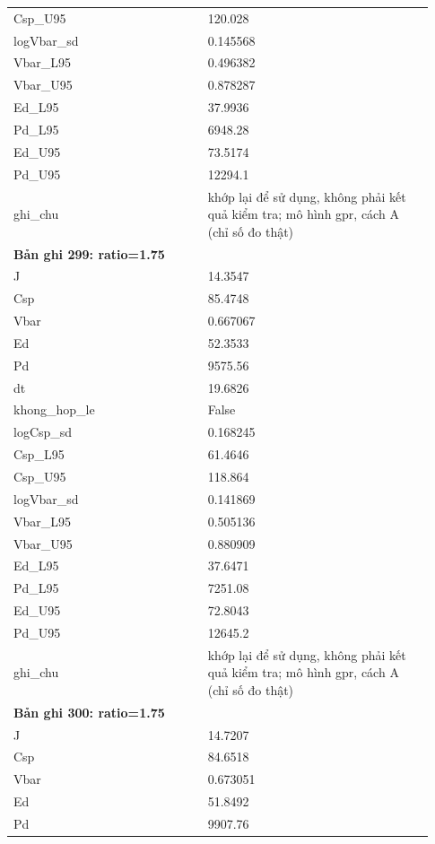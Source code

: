 \begin{longtable}{p{0.43\linewidth}p{0.50\linewidth}}
Csp\_\allowbreak U95 & 120.028 \\
logVbar\_\allowbreak sd & 0.145568 \\
Vbar\_\allowbreak L95 & 0.496382 \\
Vbar\_\allowbreak U95 & 0.878287 \\
Ed\_\allowbreak L95 & 37.9936 \\
Pd\_\allowbreak L95 & 6948.28 \\
Ed\_\allowbreak U95 & 73.5174 \\
Pd\_\allowbreak U95 & 12294.1 \\
ghi\_\allowbreak chu & khớp lại để sử dụng, không phải kết quả kiểm tra; mô hình gpr, cách A (chỉ số đo thật) \\
\midrule
\multicolumn{2}{p{0.95\linewidth}}{\textbf{Bản ghi 299: ratio=1.75}} \\
J & 14.3547 \\
Csp & 85.4748 \\
Vbar & 0.667067 \\
Ed & 52.3533 \\
Pd & 9575.56 \\
dt & 19.6826 \\
khong\_\allowbreak hop\_\allowbreak le & False \\
logCsp\_\allowbreak sd & 0.168245 \\
Csp\_\allowbreak L95 & 61.4646 \\
Csp\_\allowbreak U95 & 118.864 \\
logVbar\_\allowbreak sd & 0.141869 \\
Vbar\_\allowbreak L95 & 0.505136 \\
Vbar\_\allowbreak U95 & 0.880909 \\
Ed\_\allowbreak L95 & 37.6471 \\
Pd\_\allowbreak L95 & 7251.08 \\
Ed\_\allowbreak U95 & 72.8043 \\
Pd\_\allowbreak U95 & 12645.2 \\
ghi\_\allowbreak chu & khớp lại để sử dụng, không phải kết quả kiểm tra; mô hình gpr, cách A (chỉ số đo thật) \\
\midrule
\multicolumn{2}{p{0.95\linewidth}}{\textbf{Bản ghi 300: ratio=1.75}} \\
J & 14.7207 \\
Csp & 84.6518 \\
Vbar & 0.673051 \\
Ed & 51.8492 \\
Pd & 9907.76 \\

\end{longtable}
